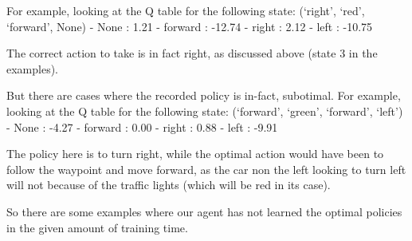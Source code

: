 \documentclass[11pt]{article}
\begin{document}
For example, looking at the Q table for the following state: (`right',
`red', `forward', None) - None : 1.21 - forward : -12.74 - right : 2.12
- left : -10.75

The correct action to take is in fact right, as discussed above (state 3
in the examples).

But there are cases where the recorded policy is in-fact, subotimal. For
example, looking at the Q table for the following state: (`forward',
`green', `forward', `left') - None : -4.27 - forward : 0.00 - right :
0.88 - left : -9.91

The policy here is to turn right, while the optimal action would have
been to follow the waypoint and move forward, as the car non the left
looking to turn left will not because of the traffic lights (which will
be red in its case).

So there are some examples where our agent has not learned the optimal
policies in the given amount of training time.


    
    
    
    
\end{document}
